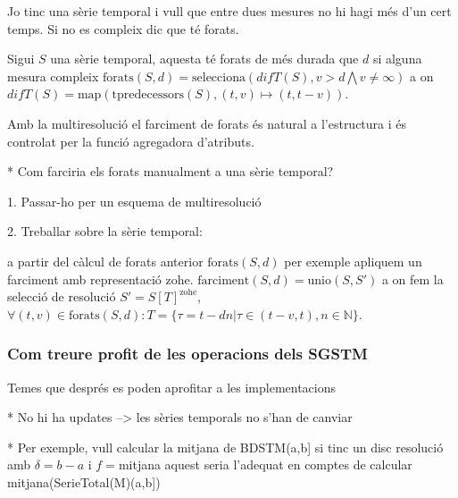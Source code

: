 Jo tinc una sèrie temporal i vull que entre dues mesures no hi hagi més d'un cert temps. Si no es compleix dic que té forats. 

Sigui $S$ una sèrie temporal, aquesta té forats de més durada que $d$
si alguna mesura compleix $\text{forats}(S,d) = \text{selecciona}(difT(S),v>d \bigwedge v\neq\infty)$ a on $difT(S) = \text{map}(\text{tpredecessors}(S),(t,v)\mapsto(t,t-v))$.

Amb la multiresolució el farciment de forats és natural a l'estructura i és controlat per la funció agregadora d'atributs.


* Com farciria els forats manualment a una sèrie temporal?

1. Passar-ho per un esquema de multiresolució

2. Treballar sobre la sèrie temporal:

a partir del càlcul de forats anterior $\text{forats}(S,d)$ per
exemple apliquem un farciment amb representació
zohe. $\text{farciment}(S,d) = \text{unio}(S,S')$ a on fem la selecció
de resolució $S' = S[T]^{\text{zohe}}$, $\forall (t,v) \in
\text{forats}(S,d): T = \{ \tau = t - dn |
\tau\in(t-v,t),n\in\mathbb{N} \}$.







\subsubsection{Com treure profit de les operacions dels SGSTM}

Temes que després es poden aprofitar a les implementacions

* No hi ha updates --> les sèries temporals no s'han de canviar

* Per exemple, vull calcular la mitjana de  BDSTM(a,b] si tinc un disc resolució amb $\delta=b-a$ i $f=$mitjana aquest seria l'adequat en comptes de calcular mitjana(SerieTotal(M)(a,b])




